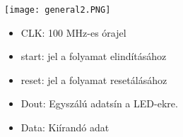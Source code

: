 \texttt{[image: general2.PNG]}

\begin{itemize}
\item CLK: 100 MHz-es órajel
\item start: jel a folyamat elindításához
\item reset: jel a folyamat resetálásához
\item Dout: Egyszálú adatsín a LED-ekre.
\item Data: Kiírandó adat
\end{itemize}